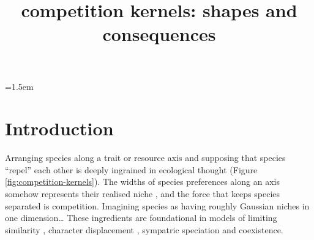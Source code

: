 \documentclass[a4paper,11pt]{article}
\title{competition kernels: shapes and consequences}
\author{}
\date{}
\affiliation{}
\begin{document}

\parindent=1.5em
\addtolength{\parskip}{.3em}


\section{Introduction}

%
%
Arranging species along a trait or resource axis and supposing that
species ``repel'' each other is deeply ingrained in ecological thought
(Figure \ref{fig:competition-kernels}).
%
The widths of species preferences along an axis somehow represents
their realised niche \citep[\textit{sensu}][]{Hutchinson-1957}, and
the force that keeps species separated is competition.
Imagining species as having roughly Gaussian niches in one dimension\ldots
These ingredients are foundational in models of limiting similarity
\citep{MacArthur-1967}, character displacement \citep{Taper-1985,
  Case-2000, Goldberg-2006}, sympatric speciation
\citep{Dieckmann-1999} and coexistence.
%
\end{document}
